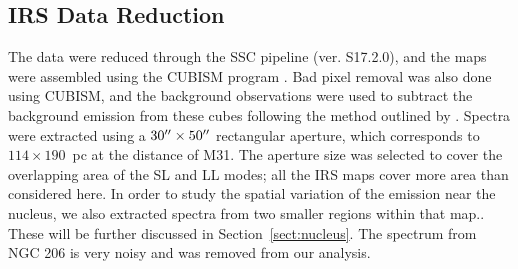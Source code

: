 \subsection{IRS Data Reduction}
\label{sect:irs_data}

The data were reduced through the SSC pipeline (ver. S17.2.0), and the maps were assembled using the CUBISM program \citep{Smith:2007fk}. 
Bad pixel removal was also done using CUBISM, and the background observations were used to subtract the background emission from these cubes 
following the method outlined by \citet{Gordon:2008lr}. Spectra were extracted using a $30\hbox{$^{\prime\prime}$}\times50\hbox{$^{\prime\prime}$}$   rectangular aperture,
which corresponds to $114\times190$~pc at the distance of M31.
The aperture size was selected to cover the overlapping area of the SL and LL modes; all the IRS maps cover more area than  considered here.
In order to study the spatial variation of the emission near the nucleus, we also extracted spectra from two smaller regions
within that map.. These will be further discussed in Section~\ref{sect:nucleus}.
The spectrum from NGC 206 is very noisy and was removed from our analysis. 


